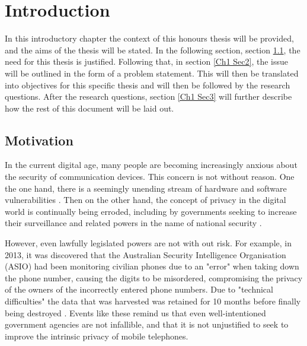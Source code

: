 
\chapter{Introduction} %

\label{Chapter 1} %

In this introductory chapter the context of this honours thesis will be provided, and the aims of the thesis will be stated.
In the following section, section \ref{Ch1 Sec1}, the need for this thesis is justified.
Following that, in section \ref{Ch1 Sec2}, the issue will be outlined in the form of a problem statement.
This will then be translated into objectives for this specific thesis and will then be followed by the research questions.
After the research questions, section \ref{Ch1 Sec3} will further describe how the rest of this document will be laid out.   


\section{Motivation}

\label{Ch1 Sec1}

In the current digital age, many people are becoming increasingly anxious about the security of communication devices.
This concern is not without reason. One the one hand, there is a seemingly unending stream of hardware and software vulnerabilities \cite{WannaCry}\cite{SpecMel}.
Then on the other hand, the concept of privacy in the digital world is continually being erroded, including by governments seeking to increase their surveillance and related powers in the name of national security \cite{Reference37}.

However, even lawfully legislated powers are not with out risk.  For example, in 2013, it was discovered that the Australian Security Intelligence Organisation (ASIO) had been monitoring civilian phones due to an "error" when taking down the phone number, causing the digits to be misordered, compromising the privacy of the owners of the incorrectly entered phone numbers.
Due to "technical difficulties" the data that was harvested was retained for 10 months before finally being destroyed \cite{Reference36}.
Events like these remind us that even well-intentioned government agencies are not infallible, and that it is not unjustified to seek to improve the intrinsic privacy of mobile telephones.

